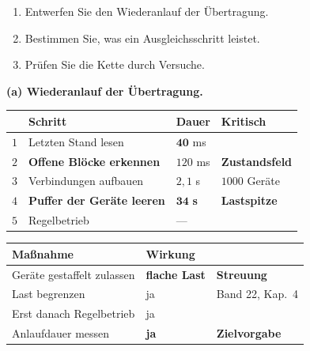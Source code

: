 \begin{aufgabe}
\begin{enumerate}[label=(\alph*)]
\item Entwerfen Sie den Wiederanlauf der Übertragung.
\item Bestimmen Sie, was ein Ausgleichsschritt leistet.
\item Prüfen Sie die Kette durch Versuche.
\end{enumerate}

\loesung
\textbf{(a) Wiederanlauf der Übertragung.}

\begin{center}
{\small
\renewcommand{\arraystretch}{1.45}
\begin{tabular}{@{}P{1.0cm}P{3.4cm}P{2.0cm}P{2.0cm}@{}}
\toprule
& \textbf{Schritt} & \textbf{Dauer} & \textbf{Kritisch}\\
\midrule
$1$ & Letzten Stand lesen & $\mathbf{40}$ ms & \\
$2$ & \textbf{Offene Blöcke erkennen} & $120$ ms & \textcolor{gruen}{\textbf{Zustands\-feld}}\\
$3$ & Verbindungen aufbauen & $2{,}1$ s & \textcolor{akzent}{$1000$ Geräte}\\
$4$ & \textbf{Puffer der Geräte leeren} & \textcolor{akzent}{$\mathbf{34}$ \textbf{s}} & \textcolor{akzent}{\textbf{Lastspitze}}\\
$5$ & Regelbetrieb & --- & \\
\bottomrule
\end{tabular}}
\end{center}

\begin{center}
\begin{minipage}{0.88\textwidth}
\end{minipage}
\end{center}

\begin{center}
\renewcommand{\arraystretch}{1.45}
\begin{tabular}{@{}P{3.0cm}P{2.2cm}P{2.8cm}@{}}
\toprule
\textbf{Maßnahme} & \textbf{Wirkung} & \\
\midrule
Geräte gestaffelt zulassen & \textcolor{gruen}{\textbf{flache Last}} & \textbf{Streuung}\\
Last begrenzen & \textcolor{gruen}{ja} & \textcolor{gruen}{Band 22, Kap.~4}\\
Erst danach Regelbetrieb & \textcolor{gruen}{ja} & \\
Anlaufdauer messen & \textcolor{gruen}{\textbf{ja}} & \textcolor{gruen}{\textbf{Zielvorgabe}}\\
\bottomrule
\end{tabular}
\end{center}


\end{aufgabe}
